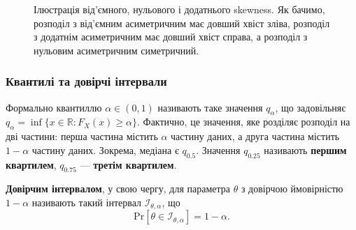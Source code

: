 \documentclass{exam_template}
\begin{document}
\begin{figure}[H]
\centering
{}
\caption{Ілюстрація від’ємного, нульового і додатнього skewness. Як бачимо, розподіл
з від’ємним асиметричним має довший хвіст зліва, розподіл з додатнім
асиметричним має довший хвіст справа, а розподіл з нульовим асиметричним
симетричний.}
\label{fig:skewness_comparison}
\end{figure}

\subsubsection{Квантилі та довірчі інтервали}\label{sec:quantiles_confidence_intervals}

Формально квантиллю $\alpha \in (0,1)$ називають таке значення $q_\alpha$, що
задовільняє $q_{\alpha} = \inf\{x \in \mathbb{R}: F_X(x) \geq \alpha\}$.
Фактично, це значення, яке розділяє розподіл на дві частини: перша частина
містить $\alpha$ частину даних, а друга частина містить $1-\alpha$ частину
даних. Зокрема, медіана є $q_{0.5}$. Значення $q_{0.25}$ називають
\textbf{першим квартилем}, $q_{0.75}$ — \textbf{третім квартилем}. 

\textbf{Довірчим інтервалом}, у свою чергу, для параметра $\theta$ з довірчою
ймовірністю $1-\alpha$ називають такий інтервал $\mathcal{I}_{\theta,\alpha}$,
що
\begin{equation*}
    \text{Pr}[\theta \in \mathcal{I}_{\theta,\alpha}] = 1 - \alpha.
\end{equation*}
\end{document}
